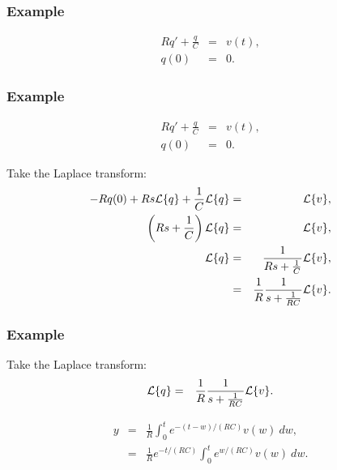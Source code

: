 \begin{frame}
  \frametitle{Example}


  {
    \begin{eqnarray*}
      R q' + \frac{q}{C} & = & v(t), \\
      q(0) & = & 0.
    \end{eqnarray*}
  }

\end{frame}

\begin{frame}
  \frametitle{Example}

    \begin{eqnarray*}
      R q' + \frac{q}{C} & = & v(t), \\
      q(0) & = & 0.
    \end{eqnarray*}

  {
    Take the Laplace transform:
    \begin{eqnarray*}
      -R q(0) + Rs\laplace{q} + \frac{1}{C} \laplace{q} & = & \laplace{v}, \\
      \lp Rs+\frac{1}{C} \rp \laplace{q}  & = & \laplace{v}, \\
      \laplace{q}  & = & \frac{1}{Rs+\frac{1}{C}} \laplace{v}, \\
      & = & \frac{1}{R} \frac{1}{s + \frac{1}{RC}} \laplace{v}.
    \end{eqnarray*}
  }


\end{frame}


\begin{frame}
  \frametitle{Example}


    Take the Laplace transform:
    \begin{eqnarray*}
      \laplace{q}  & = & \frac{1}{R} \frac{1}{s + \frac{1}{RC}} \laplace{v}.
    \end{eqnarray*}

  {

    \begin{eqnarray*}
      y & = & \frac{1}{R} \int^t_0 e^{-(t-w)/(RC)} v(w) ~ dw, \\
      & = & \frac{1}{R} e^{-t/(RC)} \int^t_0 e^{w/(RC)} v(w) ~ dw.
    \end{eqnarray*}

  }


\end{frame}




